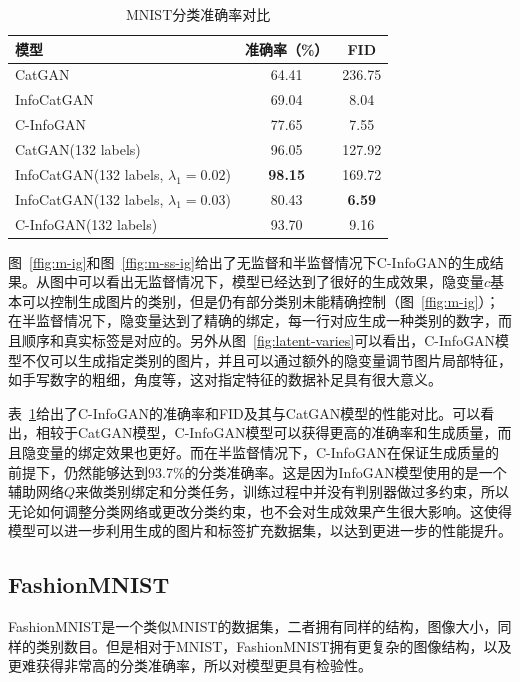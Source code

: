 \begin{table}[htbp]
  \centering
  \caption{MNIST分类准确率对比}
  \label{tab:cat}
  \begin{tabular}{|l|c|c|}
    \hline
    \textbf{模型} & \textbf{准确率（\%）} & \textbf{FID} \\
    \hline
    CatGAN & 64.41 & 236.75  \\ \hline
    InfoCatGAN & 69.04 & 8.04 \\ \hline
    C-InfoGAN & 77.65 & 7.55 \\ \hline
    CatGAN(132 labels) & 96.05 & 127.92 \\ \hline
    InfoCatGAN(132 labels, $\lambda_1 = 0.02$) & \textbf{98.15} & 169.72 \\ \hline
    InfoCatGAN(132 labels, $\lambda_1 = 0.03$) & 80.43 & \textbf{6.59} \\ \hline
    C-InfoGAN(132 labels) & 93.70 & 9.16 \\ \hline
  \end{tabular}
\end{table}

图~\ref{ffig:m-ig}和图~\ref{ffig:m-ss-ig}给出了无监督和半监督情况下C-InfoGAN的生成结果。从图中可以看出无监督情况下，模型已经达到了很好的生成效果，隐变量$c$基本可以控制生成图片的类别，但是仍有部分类别未能精确控制（图~\ref{ffig:m-ig}）；在半监督情况下，隐变量达到了精确的绑定，每一行对应生成一种类别的数字，而且顺序和真实标签是对应的。另外从图~\ref{fig:latent-varies}可以看出，C-InfoGAN模型不仅可以生成指定类别的图片，并且可以通过额外的隐变量调节图片局部特征，如手写数字的粗细，角度等，这对指定特征的数据补足具有很大意义。

表~\ref{tab:cat}给出了C-InfoGAN的准确率和FID及其与CatGAN模型的性能对比。可以看出，相较于CatGAN模型，C-InfoGAN模型可以获得更高的准确率和生成质量，而且隐变量的绑定效果也更好。而在半监督情况下，C-InfoGAN在保证生成质量的前提下，仍然能够达到93.7\%的分类准确率。这是因为InfoGAN模型使用的是一个辅助网络$Q$来做类别绑定和分类任务，训练过程中并没有判别器做过多约束，所以无论如何调整分类网络或更改分类约束，也不会对生成效果产生很大影响。这使得模型可以进一步利用生成的图片和标签扩充数据集，以达到更进一步的性能提升。

\subsection{FashionMNIST}\label{sec:fashion}

FashionMNIST\citep{xiao2017/online}是一个类似MNIST的数据集，二者拥有同样的结构，图像大小，同样的类别数目。但是相对于MNIST，FashionMNIST拥有更复杂的图像结构，以及更难获得非常高的分类准确率，所以对模型更具有检验性。

